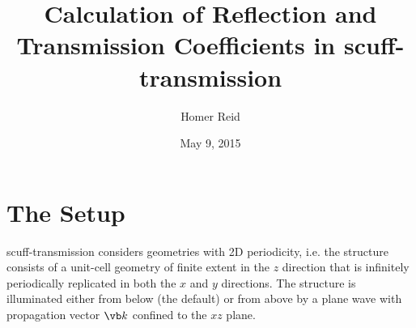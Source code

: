 \documentclass[letterpaper]{article}
\title {Calculation of Reflection and Transmission Coefficients
        in {\sc scuff-transmission}}
\author {Homer Reid}
\date {May 9, 2015}
\begin{document}
\pagestyle{myheadings}
\maketitle

\tableofcontents

\newpage
\section{The Setup}

{\sc scuff-transmission} considers geometries with 2D periodicity,
i.e. the structure consists of a unit-cell geometry of finite
extent in the $z$ direction that is infinitely periodically 
replicated in both the $x$ and $y$ directions. The structure is 
illuminated either from below (the default) or from above 
by a plane wave with propagation vector $\vb k$ confined to the 
$xz$ plane. 
\end{document}
